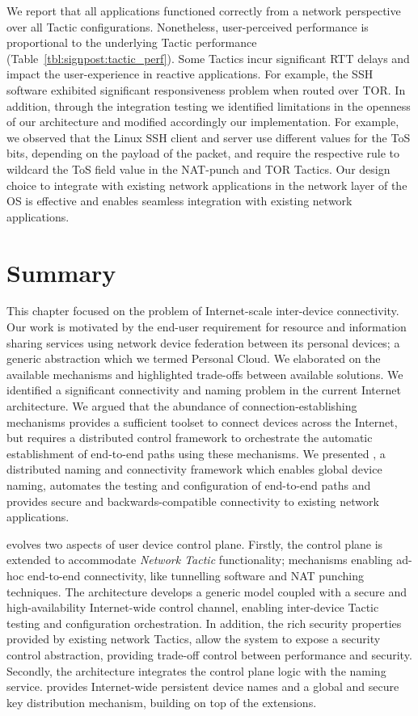 We report that all applications functioned correctly from a network perspective
over all Tactic configurations. Nonetheless, user-perceived performance is
proportional to the underlying Tactic performance
(Table~\ref{tbl:signpost:tactic_perf}).  Some Tactics incur significant RTT
delays and impact the user-experience in reactive applications. For example,
the SSH software exhibited significant responsiveness problem when routed over
TOR\@. In addition, through the integration testing we identified limitations
in the openness of our architecture and modified accordingly our
implementation. For example, we observed that the Linux SSH client and server
use different values for the ToS bits, depending on the payload of the packet,
and require the respective \of rule to wildcard the ToS field value in the
NAT-punch and TOR Tactics. Our design choice to integrate \signpost with
existing network applications in the network layer of the OS is effective and
enables seamless integration with existing network applications.

\section{Summary} \label{sec:signpost-conclusion}

This chapter focused on the problem of Internet-scale inter-device connectivity.
Our work is motivated by the end-user requirement for resource and information
sharing services using network device federation between its personal devices; a
generic abstraction which we termed Personal Cloud. We elaborated on the available
mechanisms and highlighted trade-offs between available solutions. We identified
a significant connectivity and naming problem in the current Internet
architecture.  We argued that the abundance of connection-establishing mechanisms
provides a sufficient toolset to connect devices across the Internet, but
requires a distributed control framework to orchestrate the automatic
establishment of end-to-end paths using these mechanisms. We presented \signpost,
a distributed naming and connectivity framework which enables global device
naming,  automates the testing and  configuration of end-to-end paths and
provides secure and backwards-compatible connectivity to existing network
applications. 

\signpost evolves two aspects of user device control plane. Firstly, the control
plane is extended to accommodate \textit{Network Tactic} functionality;
mechanisms enabling ad-hoc end-to-end connectivity, like tunnelling software and
NAT punching techniques. The architecture develops a generic model coupled with
a secure and high-availability Internet-wide control channel, enabling
inter-device Tactic testing and configuration orchestration.  In addition, the
rich security properties provided by existing network Tactics, allow the system
to expose a security control abstraction, providing trade-off control between
performance and security.  Secondly, the architecture integrates the control
plane logic with the naming service. \signpost provides Internet-wide
persistent device names and a global and secure key distribution mechanism,
building on top of the \dnssec extensions.


